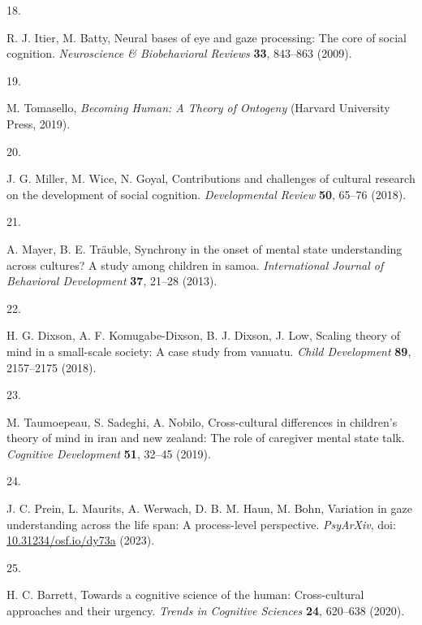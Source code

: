 \documentclass[
  man,floatsintext]{apa6}
\newlength{\cslhangindent}
\newlength{\csllabelwidth}
\newlength{\cslentryspacingunit} %
\newenvironment{CSLReferences}[2] %
 {%
  \setlength{\parindent}{0pt}
  \ifodd #1
  \let\oldpar\par
  \def\par{\hangindent=\cslhangindent\oldpar}
  \fi
  \setlength{\parskip}{#2\cslentryspacingunit}
 }%
 {}
\newcommand{\CSLLeftMargin}[1]{\parbox[t]{\csllabelwidth}{#1}}
\newcommand{\CSLRightInline}[1]{\parbox[t]{\linewidth - \csllabelwidth}{#1}\break}
\begin{document}
\begin{CSLReferences}{0}{0}
\leavevmode{}%
\CSLLeftMargin{18. }%
\CSLRightInline{R. J. Itier, M. Batty, Neural bases of eye and gaze processing: The core of social cognition. \emph{Neuroscience \& Biobehavioral Reviews} \textbf{33}, 843--863 (2009).}

\leavevmode{}%
\CSLLeftMargin{19. }%
\CSLRightInline{M. Tomasello, \emph{Becoming Human: A Theory of Ontogeny} (Harvard University Press, 2019).}

\leavevmode{}%
\CSLLeftMargin{20. }%
\CSLRightInline{J. G. Miller, M. Wice, N. Goyal, Contributions and challenges of cultural research on the development of social cognition. \emph{Developmental Review} \textbf{50}, 65--76 (2018).}

\leavevmode{}%
\CSLLeftMargin{21. }%
\CSLRightInline{A. Mayer, B. E. Träuble, Synchrony in the onset of mental state understanding across cultures? A study among children in samoa. \emph{International Journal of Behavioral Development} \textbf{37}, 21--28 (2013).}

\leavevmode{}%
\CSLLeftMargin{22. }%
\CSLRightInline{H. G. Dixson, A. F. Komugabe-Dixson, B. J. Dixson, J. Low, Scaling theory of mind in a small-scale society: A case study from vanuatu. \emph{Child Development} \textbf{89}, 2157--2175 (2018).}

\leavevmode{}%
\CSLLeftMargin{23. }%
\CSLRightInline{M. Taumoepeau, S. Sadeghi, A. Nobilo, Cross-cultural differences in children's theory of mind in iran and new zealand: The role of caregiver mental state talk. \emph{Cognitive Development} \textbf{51}, 32--45 (2019).}

\leavevmode{}%
\CSLLeftMargin{24. }%
\CSLRightInline{J. C. Prein, L. Maurits, A. Werwach, D. B. M. Haun, M. Bohn, Variation in gaze understanding across the life span: {A} process-level perspective. \emph{{PsyArXiv}}, doi: \href{https://doi.org/10.31234/osf.io/dy73a}{10.31234/osf.io/dy73a} (2023).}

\leavevmode{}%
\CSLLeftMargin{25. }%
\CSLRightInline{H. C. Barrett, Towards a cognitive science of the human: Cross-cultural approaches and their urgency. \emph{Trends in Cognitive Sciences} \textbf{24}, 620--638 (2020).}


\end{CSLReferences}
\end{document}

